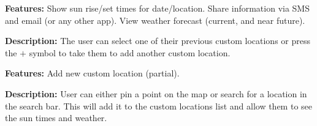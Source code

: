 \documentclass[11pt,english,numbers=endperiod,parskip=half]{scrartcl}
\begin{document}
\textbf{Features: }Show sun rise/set times for date/location. Share information
via SMS and email (or any other app). View weather forecast (current, and near future).

\begin{figure}[H]
\end{figure}
\bigskip
\textbf{Description: }The user can select one of their previous custom locations
or press the \(+\) symbol to take them to add another custom location.

\textbf{Features: }Add new custom location (partial).

\begin{figure}[H]
\end{figure}
\bigskip
\textbf{Description: }User can either pin a point on the map or search for a
location in the search bar. This will add it to the custom locations list and
allow them to see the sun times and weather.
\end{document}
